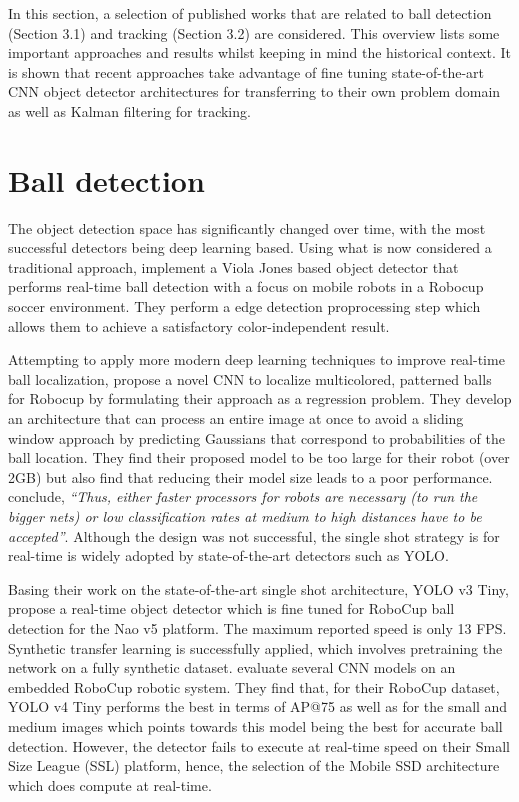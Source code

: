 \documentclass[a4paper,twoside,12pt]{report}
\begin{document}
In this section, a selection of published works that are related to ball detection  (Section 3.1) and tracking (Section 3.2) are considered. This overview lists some important approaches and results whilst keeping in mind the historical context. It is shown that recent approaches take advantage of fine tuning state-of-the-art CNN object detector architectures for transferring to their own problem domain as well as Kalman filtering for tracking.

\section{Ball detection}

The object detection space has significantly changed over time, with the most successful detectors being deep learning based. Using what is now considered a traditional approach, \cite{robovj} implement a Viola Jones based object detector that performs real-time ball detection with a focus on mobile robots in a Robocup soccer environment. They perform a edge detection proprocessing step which allows them to achieve a satisfactory color-independent result.

Attempting to apply more modern deep learning techniques to improve real-time ball localization, \cite{selfcnn} propose a novel CNN to localize multicolored, patterned balls for Robocup by formulating their approach as a regression problem. They develop an architecture that can process an entire image at once to avoid a sliding window approach by predicting Gaussians that correspond to probabilities of the ball location. They find their proposed model to be too large for their robot (over 2GB) but also find that reducing their model size leads to a poor performance. \cite{selfcnn} conclude, \textit{``Thus, either faster processors for robots are necessary (to run the bigger nets) or low classification rates at medium to high distances have to be accepted''}. Although the design was not successful, the single shot strategy is for real-time is widely adopted by state-of-the-art detectors such as YOLO.

Basing their work on the state-of-the-art single shot architecture, YOLO v3 Tiny, \cite{robo} propose a real-time object detector which is fine tuned for RoboCup ball detection for the Nao v5 platform. The maximum reported speed is only 13 FPS. Synthetic transfer learning is successfully applied, which involves pretraining the network on a fully synthetic dataset. \cite{robocupdataset} evaluate several CNN models on an embedded RoboCup robotic system. They find that, for their RoboCup dataset, YOLO v4 Tiny performs the best in terms of AP@75 as well as for the small and medium images which points towards this model being the best for accurate ball detection. However, the detector fails to execute at real-time speed on their Small Size League (SSL) platform, hence, the selection of the Mobile SSD architecture which does compute at real-time.
\end{document}
